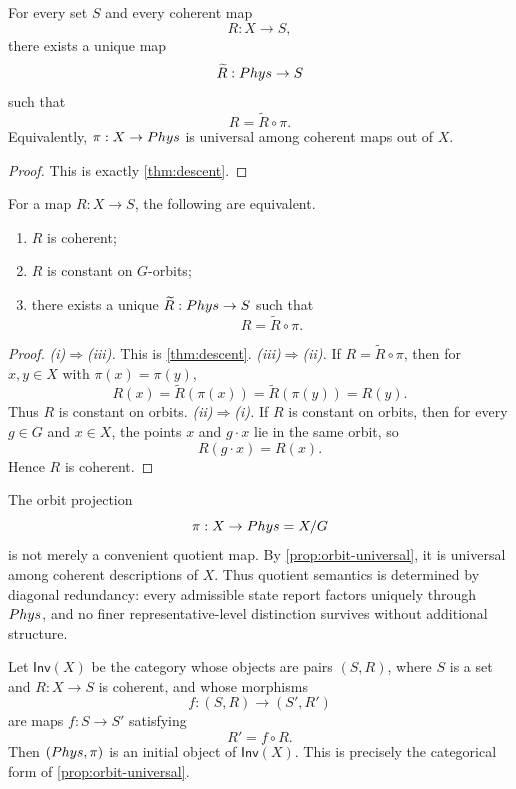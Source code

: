 \begin{proposition}
	\label{prop:orbit-universal}
	For every set \(S\) and every coherent map
	\[
		R:X\to S,
	\]
	there exists a unique map
	\[
		\widetilde R:Phys\to S
	\]
	such that
	\[
		R=\widetilde R\circ\pi.
	\]
	Equivalently, \(\pi:X\to Phys\) is universal among coherent maps out of \(X\).
\end{proposition}
\begin{proof}
	This is exactly \cref{thm:descent}.
\end{proof}
\begin{corollary}
	\label{cor:descent}
	For a map \(R:X\to S\), the following are equivalent.
	\begin{enumerate}[label=\textup{(\roman*)}]
		\item \(R\) is coherent;
		\item \(R\) is constant on \(G\)-orbits;
		\item there exists a unique \(\widetilde R:Phys\to S\) such that
		      \[
			      R=\widetilde R\circ\pi.
		      \]
	\end{enumerate}
\end{corollary}
\begin{proof}
	\emph{(i)\(\Rightarrow\)(iii).}
	This is \cref{thm:descent}.
	\smallskip
	\emph{(iii)\(\Rightarrow\)(ii).}
	If \(R=\widetilde R\circ\pi\), then for \(x,y\in X\) with
	\(\pi(x)=\pi(y)\),
	\[
		R(x)=\widetilde R(\pi(x))=\widetilde R(\pi(y))=R(y).
	\]
	Thus \(R\) is constant on orbits.
	\smallskip
	\emph{(ii)\(\Rightarrow\)(i).}
	If \(R\) is constant on orbits, then for every \(g\in G\) and
	\(x\in X\), the points \(x\) and \(g\cdot x\) lie in the same orbit, so
	\[
		R(g\cdot x)=R(x).
	\]
	Hence \(R\) is coherent.
\end{proof}
\begin{remark}
	The orbit projection
	\[
		\pi:X\to Phys=X/G
	\]
	is not merely a convenient quotient map. By
	\cref{prop:orbit-universal}, it is universal among coherent
	descriptions of \(X\). Thus quotient semantics is determined by diagonal
	redundancy: every admissible state report factors uniquely through
	\(Phys\), and no finer representative-level distinction survives
	without additional structure.
\end{remark}
\begin{remark}
	Let \(\mathsf{Inv}(X)\) be the category whose objects are pairs
	\((S,R)\), where \(S\) is a set and \(R:X\to S\) is coherent, and
	whose morphisms
	\[
		f:(S,R)\to (S',R')
	\]
	are maps \(f:S\to S'\) satisfying
	\[
		R'=f\circ R.
	\]
	Then \((Phys,\pi)\) is an initial object of \(\mathsf{Inv}(X)\).
	This is precisely the categorical form of
	\cref{prop:orbit-universal}.
\end{remark}
